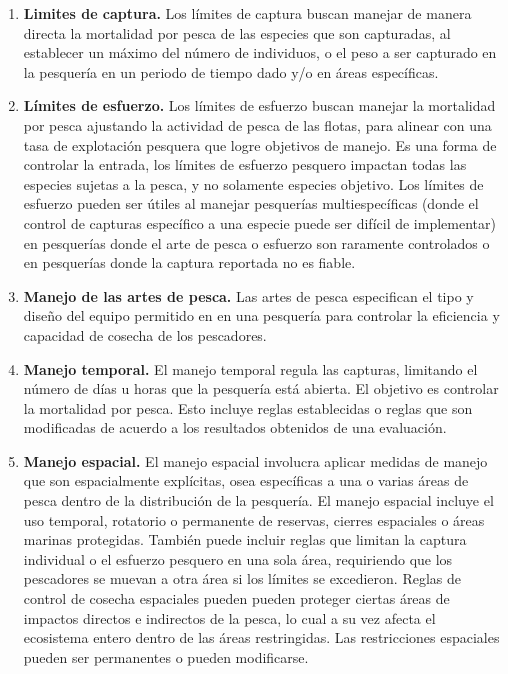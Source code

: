\documentclass[
  11pt,
]{book}
\providecommand{\tightlist}{%
  \setlength{\itemsep}{0pt}\setlength{\parskip}{0pt}}
\begin{document}
\begin{itemize}
  \begin{enumerate}
  \def\labelenumi{\alph{enumi}.}
  \tightlist
  \item
    \textbf{Limites de captura.} Los límites de captura buscan manejar de manera directa la mortalidad por pesca de las especies que son capturadas, al establecer un máximo del número de individuos, o el peso a ser capturado en la pesquería en un periodo de tiempo dado y/o en áreas específicas.
  \item
    \textbf{Límites de esfuerzo.} Los límites de esfuerzo buscan manejar la mortalidad por pesca ajustando la actividad de pesca de las flotas, para alinear con una tasa de explotación pesquera que logre objetivos de manejo. Es una forma de controlar la entrada, los límites de esfuerzo pesquero impactan todas las especies sujetas a la pesca, y no solamente especies objetivo. Los límites de esfuerzo pueden ser útiles al manejar pesquerías multiespecíficas (donde el control de capturas específico a una especie puede ser difícil de implementar) en pesquerías donde el arte de pesca o esfuerzo son raramente controlados o en pesquerías donde la captura reportada no es fiable.
  \item
    \textbf{Manejo de las artes de pesca.} Las artes de pesca especifican el tipo y diseño del equipo permitido en en una pesquería para controlar la eficiencia y capacidad de cosecha de los pescadores.
  \item
    \textbf{Manejo temporal.} El manejo temporal regula las capturas, limitando el número de días u horas que la pesquería está abierta. El objetivo es controlar la mortalidad por pesca. Esto incluye reglas establecidas o reglas que son modificadas de acuerdo a los resultados obtenidos de una evaluación.
  \item
    \textbf{Manejo espacial.} El manejo espacial involucra aplicar medidas de manejo que son espacialmente explícitas, osea específicas a una o varias áreas de pesca dentro de la distribución de la pesquería. El manejo espacial incluye el uso temporal, rotatorio o permanente de reservas, cierres espaciales o áreas marinas protegidas. También puede incluir reglas que limitan la captura individual o el esfuerzo pesquero en una sola área, requiriendo que los pescadores se muevan a otra área si los límites se excedieron. Reglas de control de cosecha espaciales pueden pueden proteger ciertas áreas de impactos directos e indirectos de la pesca, lo cual a su vez afecta el ecosistema entero dentro de las áreas restringidas. Las restricciones espaciales pueden ser permanentes o pueden modificarse.

\end{enumerate}
\end{itemize}
\end{document}
